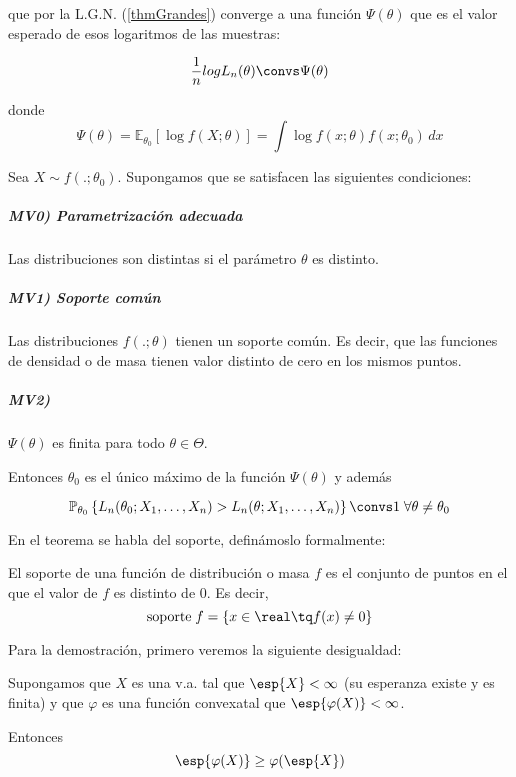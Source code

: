 \documentclass{apuntes}
\begin{document}
que por la L.G.N. (\ref{thmGrandes}) converge a una función $\Psi(\theta)$ que es el valor esperado de esos logaritmos de las muestras:

\[ \frac{1}{n} log L_n(\theta) \convs \Psi(\theta) \]

donde \[ \Psi(\theta) = \mathbb{E}_{\theta_0} \left[\log f(X;\theta)\right] = \int\log f(x;\theta) f(x;\theta_0) \, dx \]

\newpage
\begin{theorem}[Teorema\IS MV1] \label{thmMV} Sea $X\sim f(.;\theta_0)$. Supongamos que se satisfacen las siguientes condiciones:

\subparagraph{MV0) Parametrización adecuada} Las distribuciones son distintas si el parámetro $\theta$ es distinto.

\subparagraph{MV1) Soporte común} Las distribuciones $f(.;\theta)$ tienen un soporte común. Es decir, que las funciones de densidad o de masa tienen valor distinto de cero en los mismos puntos.

\subparagraph{MV2)} $\Psi(\theta)$ es finita para todo $\theta \in \Theta$.

Entonces $\theta_0$ es el único máximo de la función $\Psi(\theta)$ y además

\[ \mathbb{P}_{\theta_0} \left\lbrace L_n(\theta_0;X_1,\dotsc,X_n) >  L_n(\theta;X_1,\dotsc,X_n) \right\rbrace \convs 1\; \forall \theta \neq \theta_0 \]

\end{theorem}

En el teorema se habla del soporte, definámoslo formalmente:

\begin{defn}[Soporte] El soporte de una función de distribución o masa $f$ es el conjunto de puntos en el que el valor de $f$ es distinto de 0. Es decir, \[ \mathrm{soporte}\; f = \{ x \in \real \tq f(x) \neq 0 \} \]
\end{defn}

Para la demostración, primero veremos la siguiente desigualdad:

\begin{theorem} Supongamos que $X$ es una v.a. tal que $\esp{X}< \infty$ (su esperanza existe y es finita) y que $\varphi$ es una función convexa\footnotemark tal que $\esp{\varphi(X)} < \infty$.

Entonces \[ \esp{\varphi(X)} \geq \varphi(\esp{X}) \] \label{desJensen}
\end{theorem}
\end{document}
